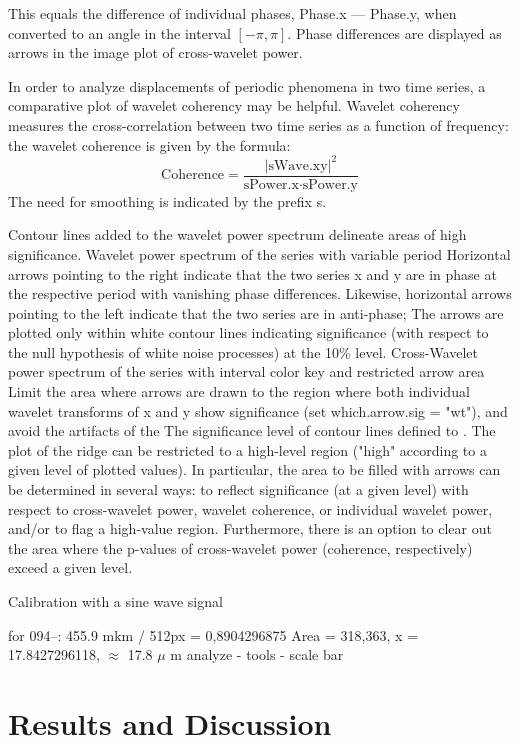 \documentclass{biophys-new}
\begin{document}
This equals the difference of individual phases, Phase.x --- Phase.y, when converted to an angle in the
interval $[-\pi,\pi]$.
Phase differences are displayed as arrows in the image plot of cross-wavelet power.

In order to analyze displacements of periodic phenomena in two time series, a comparative plot of wavelet coherency may be helpful.
Wavelet coherency  measures the cross-correlation between two time series as a function of frequency: the wavelet coherence is given by the formula:
\begin{equation}\label{eq:coherence}
\text{Coherence}=\frac{|\text{sWave.xy}|^2}{\text{sPower.x}\cdot\text{sPower.y}}
\end{equation}
The need for smoothing is indicated by the prefix s.


Contour lines added to the wavelet power spectrum delineate areas of high significance.
Wavelet power spectrum of the series with variable period
Horizontal arrows pointing to the right indicate that the two series x and y are in phase at the respective period with vanishing phase differences.
Likewise, horizontal arrows pointing to the left indicate that the two series are in anti-phase;
The arrows are plotted only within white contour lines indicating significance (with respect to the null hypothesis of white noise processes) at the 10\% level.
Cross-Wavelet power spectrum of the series with interval color key and restricted arrow area
Limit the area where arrows are drawn to the region where both individual wavelet transforms of x and y show significance (set which.arrow.sig = "wt"), and avoid the artifacts of the
The significance level of contour lines defined to . The plot of the ridge can be restricted to a high-level region ("high" according to a given level of plotted values). In particular, the area to be filled with arrows can be determined in several ways: to reflect significance (at a given level) with respect to cross-wavelet power, wavelet coherence, or individual wavelet power, and/or to flag a high-value region. Furthermore, there is an option to clear out the area where the p-values of cross-wavelet power (coherence, respectively) exceed a given level.

Calibration with a sine wave signal

for 094--: 455.9 mkm / 512px = 0,8904296875
Area = 318,363, x = 17.8427296118, $\approx$ 17.8 $\mu$ m
analyze - tools - scale bar


\section*{Results and Discussion}
\end{document}
